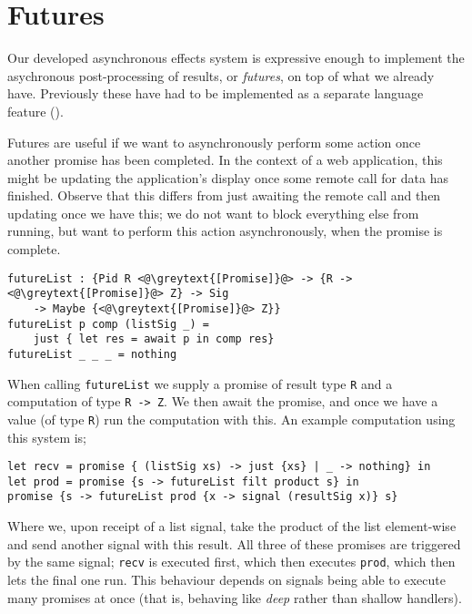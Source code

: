 \documentclass[msc,deptreport,cs]{infthesis} %
\newcommand{\code}[1]{\lstinline{#1}}
\newcommand{\greytext}[1]{\textcolor{black!40}{#1}}
\begin{document}

\section{Futures}
\label{sec:futures}

Our developed asynchronous effects system is expressive enough to implement the
asychronous post-processing of results, or \emph{futures}, on top of what we
already have. Previously these have had to be implemented as a separate language
feature (\cite{schwinghammer2002concurrent}).

Futures are useful if we want to asynchronously perform some action once another
promise has been completed. In the context of a web application, this might be
updating the application's display once some remote call for data has finished.
Observe that this differs from just awaiting the remote call and then updating
once we have this; we do not want to block everything else from running, but
want to perform this action asynchronously, when the promise is complete.

\begin{lstlisting}
futureList : {Pid R <@\greytext{[Promise]}@> -> {R -> <@\greytext{[Promise]}@> Z} -> Sig
    -> Maybe {<@\greytext{[Promise]}@> Z}}
futureList p comp (listSig _) =
    just { let res = await p in comp res}
futureList _ _ _ = nothing
\end{lstlisting}

\noindent When calling \code{futureList} we supply a promise of result type
\code{R} and a computation of type \code{R -> Z}. We then await the promise, and
once we have a value (of type \code{R}) run the computation with this. An
example computation using this system is;

\begin{lstlisting}
let recv = promise { (listSig xs) -> just {xs} | _ -> nothing} in
let prod = promise {s -> futureList filt product s} in
promise {s -> futureList prod {x -> signal (resultSig x)} s}
\end{lstlisting}

\noindent Where we, upon receipt of a list signal, take the product of the list
element-wise and send another signal with this result. All three of these
promises are triggered by the same signal; \code{recv} is executed first, which
then executes \code{prod}, which then lets the final one run. This behaviour
depends on signals being able to execute many promises at once (that is,
behaving like \emph{deep} rather than shallow handlers).
\end{document}
